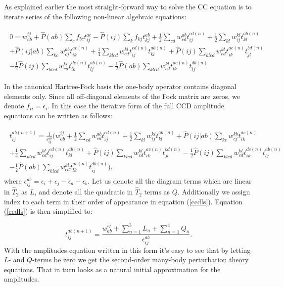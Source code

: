\documentclass[twoside,english]{uiofysmaster}
\begin{document}
As explained earlier the most straight-forward way to solve the CC equation is to iterate series of the following non-linear algebraic equations:

\begin{align}
\begin{split}
0 = w_{ab}^{ij} + \hat{P}(ab)\sum_{c}f_{bc}t_{ij}^{ac} - \hat{P}(ij)\sum_{k}f_{kj} t_{kj}^{ab} + \frac{1}{2}\sum_{cd}w_{cd}^{ab}t_{ij}^{cd(n)} + \frac{1}{2}\sum_{kl}w_{ij}^{kl}t_{kl}^{ab(n)}\\ + \hat{P}(ij|ab)\sum_{kc}w_{cj}^{kb}t_{ik}^{ac(n)}
+ \frac{1}{4}\sum_{klcd}w_{cd}^{kl}t_{ij}^{cd(n)}t_{kl}^{ab(n)} + \hat{P}(ij)\sum_{klcd}w_{cd}^{kl}t_{ik}^{ac(n)}t_{jl}^{bd(n)}\\ - \frac{1}{2}\hat{P}(ij)\sum_{klcd}w_{cd}^{kl}t_{ik}^{dc(n)}t_{lj}^{ab(n)} - \frac{1}{2}\hat{P}(ab)\sum_{klcd}w_{cd}^{kl}t_{lk}^{ac(n)}t_{ij}^{db(n)}.
\end{split}
\end{align}

In the canonical Hartree-Fock basis the one-body operator contains diagonal elements only. Since all off-diagonal elements of the Fock matrix are zeros, we denote $f_{ii} = \epsilon_i$. In this case the iterative form of the full CCD amplitude equations can be written as follows:

\begin{align}\label{ccdls}
\begin{split}
	t_{ij}^{ab(n+1)} = \frac{1}{\epsilon_{ij}^{ab}}(w_{ab}^{ij} + \frac{1}{2}\sum_{cd}w_{cd}^{ab}t_{ij}^{cd(n)} + \frac{1}{2}\sum_{kl}w_{ij}^{kl}t_{kl}^{ab(n)} + \hat{P}(ij|ab)\sum_{kc}w_{cj}^{kb}t_{ik}^{ac(n)}\\
	+ \frac{1}{4}\sum_{klcd}w_{cd}^{kl}t_{ij}^{cd(n)}t_{kl}^{ab(n)} + \hat{P}(ij)\sum_{klcd}w_{cd}^{kl}t_{ik}^{ac(n)}t_{jl}^{bd(n)} - \frac{1}{2}\hat{P}(ij)\sum_{klcd}w_{cd}^{kl}t_{ik}^{dc(n)}t_{lj}^{ab(n)}\\ - \frac{1}{2}\hat{P}(ab)\sum_{klcd}w_{cd}^{kl}t_{lk}^{ac(n)}t_{ij}^{db(n)}),
\end{split}
\end{align}
where $\epsilon_{ij}^{ab} = \epsilon_i + \epsilon_j - \epsilon_a - \epsilon_b$. Let us denote all the diagram terms which are  linear in $\hat{T}_2$ as $L$, and denote all the quadratic in $\hat{T}_2$ terms as $Q$. Additionally we assign index to each term in their order of appearance in equation (\ref{ccdls}). Equation (\ref{ccdls}) is then simplified to: 

\begin{equation}\label{firsttarationamp}
t_{ij}^{ab(n+1)} = \frac{w_{ab}^{ij} + \sum_{n=1}^3L_n + \sum_{n=1}^4Q_n}{\epsilon_{ij}^{ab}}.
\end{equation}
With the amplitudes equation written in this form it's easy to see that by letting $L$- and $Q$-terms be zero we get the second-order many-body perturbation theory equations. That in turn looks as a natural initial approximation for the amplitudes.
\end{document}
